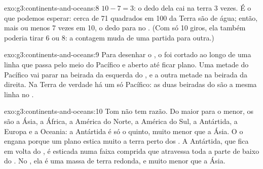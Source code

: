 \begin{solution}{exo:g3:continents-and-oceans:8}
$10 - 7 = 3$: o dedo dela cai na terra 3 vezes. É o que podemos esperar:
cerca de 71 quadrados em 100 da Terra são de água; então, mais ou menos 7
vezes em 10, o dedo para no . (Com só 10 giros, ela também poderia
tirar 6 ou 8: a contagem muda de uma partida para outra.)
\end{solution}

\begin{solution}{exo:g3:continents-and-oceans:9}
Para desenhar o , o  foi cortado ao longo de uma linha que
passa pelo meio do  Pacífico e aberto até ficar plano. Uma metade do
Pacífico vai parar na beirada da esquerda do , e a outra metade na
beirada da direita. Na Terra de verdade há um só  Pacífico: as duas
beiradas do  são a mesma linha no .
\end{solution}

\begin{solution}{exo:g3:continents-and-oceans:10}
Tom não tem razão. Do maior para o menor, os  são a Ásia, a
África, a América do Norte, a América do Sul, a Antártida, a Europa e a
Oceania: a Antártida é só o quinto, muito menor que a Ásia. O  o
engana porque um  plano estica muito a terra perto dos . A
Antártida, que fica em volta do , é esticada numa faixa comprida
que atravessa toda a parte de baixo do . No , ela é uma massa de
terra redonda, e muito menor que a Ásia.
\end{solution}
